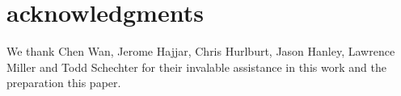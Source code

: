 \section{acknowledgments}\label{sec:acknowledgments}

We thank Chen Wan, Jerome Hajjar, Chris Hurlburt, Jason Hanley, Lawrence Miller and Todd Schechter  for their invalable assistance in this work and the preparation this paper. 

